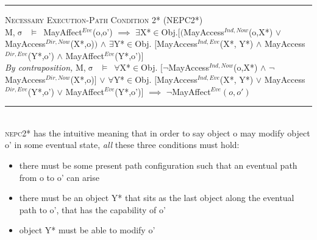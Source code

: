 \documentclass[a4paper,11pt, twoside,twocolumn]{article}
\newenvironment{logic}[1][]
{\begin{flushleft} \small }
{\end{flushleft}}
\newcommand{\loin}{$\in$}
\newcommand{\loforall}{$\forall$}
\newcommand{\loexists}{$\exists$}
\newcommand{\loand}{$\land$}
\newcommand{\loor} {$\lor$}
\newcommand{\loimplies}{$\implies$}
\newcommand{\losigma}{$\upsigma$}
\newcommand{\loturns} {$\vDash$}
\newcommand{\loneg}{$\boldsymbol \neg$}
\newcommand{\ablock} {\null\qquad}
\begin{document}
\begin{minipage}{\linewidth}
\begin{logic}

\hrule\null
\textsc{\normalsize *Necessary Execution-Path Condition 2* (NEPC2*)}\\
M,\losigma\ \loturns\ MayAffect$^{Eve}$(o,o')\linebreak
\ablock \loimplies\linebreak
\ablock \loexists X*\loin Obj.$[($MayAccess$^{Ind,Now}$(o,X*) \loor \linebreak
\ablock \ablock \ablock \quad MayAccess$^{Dir,Now}$(X*,o)$)$\linebreak
\ablock \ablock \ablock \ablock \loand \linebreak
\ablock \loexists Y*\loin{Obj}. $[$MayAccess$^{Ind,Eve}$(X*, Y*) \loand\linebreak
\ablock \ablock \ablock \quad MayAccess$^{Dir,Eve}$(Y*,o') \loand\linebreak
\ablock \ablock \ablock \quad MayAffect$^{Eve}$(Y*,o')$]$
\linebreak \\
\textit{By contraposition,}\linebreak
M,\losigma\ \loturns\ 
\loforall X*\loin Obj. $[$\loneg MayAccess$^{Ind,Now}$(o,X*) \loand \linebreak
\ablock \ablock \ablock \ablock \loneg MayAccess$^{Dir,Now}$(X*,o)$]$\linebreak
\ablock \ablock \ablock \ablock \loor \linebreak
\ablock \quad\loforall Y*\loin{Obj}. $[$MayAccess$^{Ind,Eve}$(X*, Y*) \loor\linebreak
\ablock \ablock \ablock \ablock MayAccess$^{Dir,Eve}$(Y*,o') \loor\linebreak
\ablock \ablock \ablock \ablock MayAffect$^{Eve}$(Y*,o')$]$
\ablock \loimplies \linebreak
	\ablock\loneg MayAffect$^{Eve}(o,o')$\linebreak
\hrule\null
\end{logic}
\end{minipage}
\linebreak\\

\textsc{nepc2*} has the intuitive meaning that in order to say object o may modify object o' in some eventual state, \textit{all} these three conditions must hold:
\begin{itemize}
\item there must be some present path configuration such that an eventual path from o to o' can arise
\item there must be an object Y* that sits as the last object along the eventual path to o', that has the capability of o'
\item object Y* must be able to modify o'
\end{itemize} 
\end{document}
